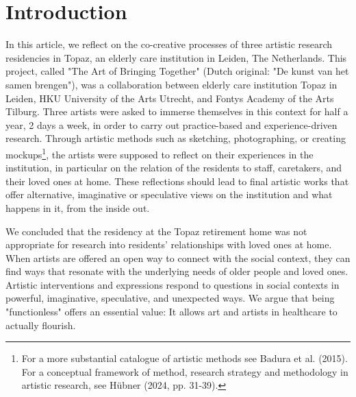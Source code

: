 \documentclass[authordate, empirical]{jote-new-article}
\author[1]{\mbox{Falk Hübner\orcid{0000-0002-1469-1282}}}
\affil[1]{Fontys Academy of the Arts}
\author[2]{\mbox{Gjilke Keuning\orcid{0009-0003-6222-0420}}}
\affil[2]{HKU University of the Arts}
\author[1]{\mbox{Marijke Lucas\orcid{0009-0005-3219-3294}}}
\begin{document}
\begin{frontmatter}
  \maketitle
  \begin{abstract}
    \printabstracttext
  \end{abstract}
\end{frontmatter}


	\section{Introduction}



	In this article, we reflect on the co-creative processes of three artistic research residencies in Topaz, an elderly care institution in Leiden, The Netherlands. This project, called "The Art of Bringing Together" (Dutch original: "De kunst van het samen brengen"), was a collaboration between elderly care institution Topaz in Leiden, HKU University of the Arts Utrecht, and Fontys Academy of the Arts Tilburg. Three artists were asked to immerse themselves in this context for half a year, 2 days a week, in order to carry out practice-based and experience-driven research. Through artistic methods such as sketching, photographing, or creating mockups\footnote{ For a more substantial catalogue of artistic methods see Badura et al. (2015). For a conceptual framework of method, research strategy and methodology in artistic research, see Hübner (2024, pp. 31-39).}, the artists were supposed to reflect on their experiences in the institution, in particular on the relation of the residents to staff, caretakers, and their loved ones at home. These reflections should lead to final artistic works that offer alternative, imaginative or speculative views on the institution and what happens in it, from the inside out.

	\begin{flushleft}
		\begin{takeHomeMessage}
			We concluded that the residency at the Topaz retirement home was not appropriate for research into residents' relationships with loved ones at home. When artists are offered an open way to connect with the social context, they can find ways that resonate with the underlying needs of older people and loved ones. Artistic interventions and expressions respond to questions in social contexts in powerful, imaginative, speculative, and unexpected ways. We argue that being "functionless" offers an essential value: It allows art and artists in healthcare to actually flourish.
		\end{takeHomeMessage}
	\end{flushleft}
	
\end{document}
